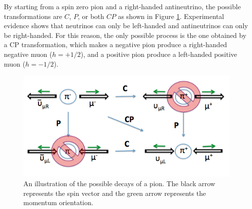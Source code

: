 \documentclass{outhesis}
\begin{document}
By starting from a spin zero pion and a right-handed antineutrino, the possible transformations are $C$, $P$, or both $CP$ as shown in Figure \ref{fig:cp}. Experimental evidence shows that neutrinos can only be left-handed and antineutrinos can only be right-handed. For this reason, the only possible process is the one obtained by a CP transformation, which makes a negative pion produce a right-handed negative muon ($h=+1/2$), and a positive pion produce a left-handed positive muon ($h=-1/2$). 
\begin{figure}
  \centering
  \includegraphics[scale=0.5]{figures/pion_cp}
  \caption[Pion decay]{An illustration of the possible decays of a pion. The black arrow represents the spin vector and the green arrow represents the momentum orientation.}
  \label{fig:cp}
\end{figure}
\end{document}
